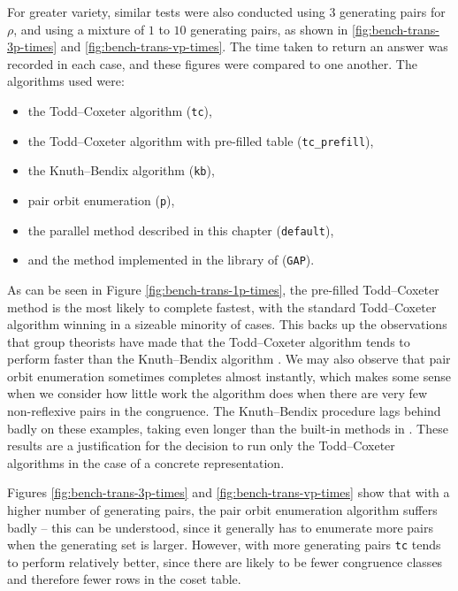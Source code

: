 For greater variety, similar tests were also conducted using $3$ generating
pairs for $\rho$, and using a mixture of $1$ to $10$ generating pairs,
as shown in \ref{fig:bench-trans-3p-times} and \ref{fig:bench-trans-vp-times}.
The time taken to return an answer was recorded in each case, and these figures
were compared to one another.  The algorithms used were:
\begin{itemize}
\item the Todd--Coxeter algorithm (\texttt{tc}),
\item the Todd--Coxeter algorithm with pre-filled table (\texttt{tc\_prefill}),
\item the Knuth--Bendix algorithm (\texttt{kb}),
\item pair orbit enumeration (\texttt{p}),
\item the parallel method described in this chapter (\texttt{default}),
\item and the method implemented in the library of \GAP{} (\texttt{GAP}).
\end{itemize}

As can be seen in Figure \ref{fig:bench-trans-1p-times}, the pre-filled
Todd--Coxeter method is the most likely to complete fastest, with the standard
Todd--Coxeter algorithm winning in a sizeable minority of cases.  This backs up the
observations that group theorists have made that the Todd--Coxeter algorithm tends to perform
faster than the Knuth--Bendix algorithm \cite{havascomparing}.  We may also observe that pair
orbit enumeration sometimes completes almost instantly, which makes some sense
when we consider how little work the algorithm does when there are very few
non-reflexive pairs in the congruence.  The Knuth--Bendix procedure lags behind
badly on these examples, taking even longer than the built-in methods in \GAP{}.
These results are a justification for the decision to run only the Todd--Coxeter
algorithms in the case of a concrete representation.

Figures \ref{fig:bench-trans-3p-times} and \ref{fig:bench-trans-vp-times} show
that with a higher number of generating pairs, the pair orbit enumeration
algorithm suffers badly -- this can be understood, since it generally has to
enumerate more pairs when the generating set is larger.  However, with more
generating pairs \texttt{tc} tends to perform relatively better, since there are
likely to be fewer congruence classes and therefore fewer rows in the coset
table.

